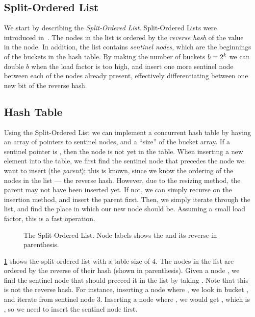 \subsection{Split-Ordered List}

We start by describing the \emph{Split-Ordered List}. Split-Ordered Lists were introduced
in~\cite{shalev2006split}. The nodes in the list is ordered by the \emph{reverse hash} of the value
in the node. In addition, the list contains \emph{sentinel nodes}, which are the beginnings of the
buckets in the hash table. By making the number of buckets $b=2\sp{k}$ we can double $b$ when the
load factor is too high, and insert one more sentinel node between each of the nodes already
present, effectively differentiating between one new bit of the reverse hash.

\subsection{Hash Table}

Using the Split-Ordered List we can implement a concurrent hash table by having an array of
pointers to sentinel nodes, and a ``size'' of the bucket array. If a sentinel pointer is
, then the node is not yet in the table. When inserting a new element into the table, we
first find the sentinel node that precedes the node we want to insert (the \emph{parent}); this is
known, since we know the ordering of the nodes in the list --- the reverse hash. However, due to
the resizing method, the parent may not have been inserted yet. If not, we can simply recurse on
the insertion method, and insert the parent first. Then, we simply iterate through the list, and
find the place in which our new node should be. Assuming a small load factor, this is a fast
operation.

\begin{figure}[ht]
\centering

\caption{The Split-Ordered List. Node labels shows the  and its reverse in
parenthesis.\label{fig:split-order-list}}
\end{figure}

\cref{fig:split-order-list} shows the split-ordered list with a table size of $4$. The nodes in the
list are ordered by the reverse of their hash (shown in parenthesis). Given a node , we
find the sentinel node that should preceed it in the list by taking .
Note that this is not the reverse hash. For instance,
inserting a node where , we look in bucket , and iterate from
sentinel node 3.
Inserting a node where , we would get , which is ,
so we need to insert the sentinel node first.


